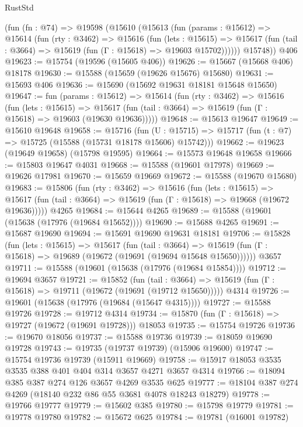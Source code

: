 \begin{lexlean}{RustStd}
\begin{coremodule}
    (fun (fn : @74) =>
    @19598
      (@15610
        (@15613
          (fun (params : @15612) =>
          @15614
            (fun (rty : @3462) =>
            @15616
              (fun (lets : @15615) =>
              @15617 (fun (tail : @3664) => @15619 (fun (Γ : @15618) => @19603 @15702))))))
        @15748))
    @406
@19623 := @15754 (@19596 (@15605 @406))
@19626 := @15667 (@15668 @406) @18178
@19630 := @15588 (@15659 (@19626 @15676) @15680)
@19631 := @15693 @406
@19636 := @15690 (@15692 @19631 @18181 @15648 @15650)
@19647 := fun (params : @15612) =>
  @15614
    (fun (rty : @3462) =>
    @15616
      (fun (lets : @15615) =>
      @15617 (fun (tail : @3664) => @15619 (fun (Γ : @15618) => @19603 (@19630 @19636)))))
@19648 := @15613 @19647
@19649 := @15610 @19648
@19658 := @15716
    (fun (U : @15715) => @15717 (fun (t : @7) => @15725 (@15588 (@15731 @18178 @15606) @15742)))
@19662 := @19623 (@19649 @19658) (@15798 @19595)
@19664 := @15573 @19648 @19658
@19666 := @15803 @19647 @4031
@19668 := @15588 (@19601 @17978)
@19669 := @19626 @17981
@19670 := @15659 @19669
@19672 := @15588 (@19670 @15680)
@19683 := @15806
    (fun (rty : @3462) =>
    @15616
      (fun (lets : @15615) =>
      @15617 (fun (tail : @3664) => @15619 (fun (Γ : @15618) => @19668 (@19672 @19636)))))
    @4265
@19684 := @15644 @4265
@19689 := @15588 (@19601 (@15638 (@17976 (@19684 @15652))))
@19690 := @15688 @4265
@19691 := @15687 @19690
@19694 := @15691 @19690 @19631 @18181
@19706 := @15828
    (fun (lets : @15615) =>
    @15617
      (fun (tail : @3664) =>
      @15619 (fun (Γ : @15618) => @19689 (@19672 (@19691 (@19694 @15648 @15650))))))
    @3657
@19711 := @15588 (@19601 (@15638 (@17976 (@19684 @15854))))
@19712 := @19694 @3657
@19721 := @15852
    (fun (tail : @3664) => @15619 (fun (Γ : @15618) => @19711 (@19672 (@19691 (@19712 @15650)))))
    @4314
@19726 := @19601 (@15638 (@17976 (@19684 (@15647 @4315))))
@19727 := @15588 @19726
@19728 := @19712 @4314
@19734 := @15870 (fun (Γ : @15618) => @19727 (@19672 (@19691 @19728))) @18053
@19735 := @15754 @19726
@19736 := @19670 @18056
@19737 := @15588 @19736
@19739 := @18059 @19690 @19728
@19743 := @19735 (@19737 @19739) (@15906 @19600)
@19747 := @15754 @19736 @19739 (@15911 @19669)
@19758 := @15917 @18053 @3535 @3535 @388 @401 @404 @314 @3657 @4271 @3657 @4314
@19766 := @18094 @385 @387 @274 @126 @3657 @4269 @3535 @625
@19777 := @18104 @387 @274 @4269 (@18140 @232 @86 @55 @3681 @4078 @18243 @18279)
@19778 := @19766 @19777
@19779 := @15602 @385
@19780 := @15798 @19779
@19781 := @19778 @19780
@19782 := @15672 @625
@19784 := @19781 (@16001 @19782)

\end{coremodule}
\end{lexlean}
